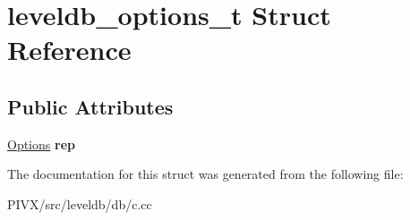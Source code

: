 \hypertarget{structleveldb__options__t}{}\section{leveldb\+\_\+options\+\_\+t Struct Reference}
\label{structleveldb__options__t}
\subsection*{Public Attributes}
\begin{DoxyCompactItemize}
\item 
\mbox{\label{structleveldb__options__t_a4f9a6dde987957ab489bf26c9d191df9}} 
\mbox{\hyperlink{structleveldb_1_1_options}{Options}} {\bfseries rep}
\end{DoxyCompactItemize}


The documentation for this struct was generated from the following file\+:\begin{DoxyCompactItemize}
\item 
P\+I\+V\+X/src/leveldb/db/c.\+cc\end{DoxyCompactItemize}
